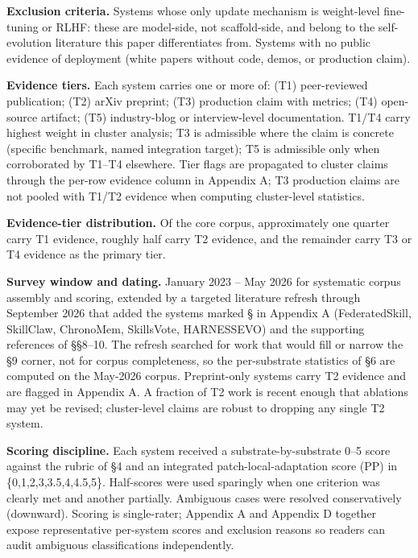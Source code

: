 \documentclass[
]{article}
\begin{document}
\textbf{Exclusion criteria.} Systems whose only update mechanism is
weight-level fine-tuning or RLHF: these are model-side, not
scaffold-side, and belong to the self-evolution literature this paper
differentiates from. Systems with no public evidence of deployment
(white papers without code, demos, or production claim).

\textbf{Evidence tiers.} Each system carries one or more of: (T1)
peer-reviewed publication; (T2) arXiv preprint; (T3) production claim
with metrics; (T4) open-source artifact; (T5) industry-blog or
interview-level documentation. T1/T4 carry highest weight in cluster
analysis; T3 is admissible where the claim is concrete (specific
benchmark, named integration target); T5 is admissible only when
corroborated by T1--T4 elsewhere. Tier flags are propagated to cluster
claims through the per-row evidence column in Appendix A; T3 production
claims are not pooled with T1/T2 evidence when computing cluster-level
statistics.

\textbf{Evidence-tier distribution.} Of the core corpus, approximately
one quarter carry T1 evidence, roughly half carry T2 evidence, and the
remainder carry T3 or T4 evidence as the primary tier.

\textbf{Survey window and dating.} January 2023 -- May 2026 for
systematic corpus assembly and scoring, extended by a targeted
literature refresh through September 2026 that added the systems marked
§ in Appendix A (FederatedSkill, SkillClaw, ChronoMem, SkillsVote,
HARNESSEVO) and the supporting references of §§8--10. The refresh
searched for work that would fill or narrow the §9 corner, not for
corpus completeness, so the per-substrate statistics of §6 are computed
on the May-2026 corpus. Preprint-only systems carry T2 evidence and are
flagged in Appendix A. A fraction of T2 work is recent enough that
ablations may yet be revised; cluster-level claims are robust to
dropping any single T2 system.

\textbf{Scoring discipline.} Each system received a
substrate-by-substrate 0--5 score against the rubric of §4 and an
integrated patch-local-adaptation score (PP) in \{0,1,2,3,3.5,4,4.5,5\}.
Half-scores were used sparingly when one criterion was clearly met and
another partially. Ambiguous cases were resolved conservatively
(downward). Scoring is single-rater; Appendix A and Appendix D together
expose representative per-system scores and exclusion reasons so readers
can audit ambiguous classifications independently.
\end{document}
